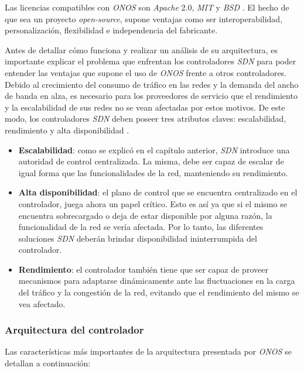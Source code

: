 Las licencias compatibles con \textit{ONOS} son \textit{Apache} 2.0, \textit{MIT} y \textit{BSD} \parencite{onfflic}. El hecho de que sea un proyecto \textit{open-source}, supone ventajas como ser interoperabilidad, personalización, flexibilidad e independencia del fabricante. 

Antes de detallar cómo funciona y realizar un análisis de su arquitectura, es importante explicar el problema que enfrentan los controladores \textit{SDN} para poder entender las ventajas que supone el uso de \textit{ONOS} frente a otros controladores. 
\\

Debido al crecimiento del consumo de tráfico en las redes y la demanda del ancho de banda en alza, es necesario para los proveedores de servicio que el rendimiento y la escalabilidad de sus redes no se vean afectadas por estos motivos. De este modo, los controladores \textit{SDN} deben poseer tres atributos claves: escalabilidad, rendimiento y alta disponibilidad \parencite{sdnproblema}.

\begin{itemize}
	\item \textbf{Escalabilidad}: como se explicó en el capítulo anterior, \textit{SDN} introduce una autoridad de control centralizada. La misma, debe ser capaz de escalar de igual forma que las funcionalidades de la red, manteniendo su rendimiento.
	\item \textbf{Alta disponibilidad}: el plano de control que se encuentra centralizado en el controlador, juega ahora un papel crítico. Esto es así ya que si el mismo se encuentra sobrecargado o deja de estar disponible por alguna razón, la funcionalidad de la red se vería afectada. Por lo tanto, las diferentes soluciones \textit{SDN} deberán brindar disponibilidad ininterrumpida del controlador.
	\item \textbf{Rendimiento}: el controlador también tiene que ser capaz de proveer mecanismos para adaptarse dinámicamente ante las fluctuaciones en la carga del tráfico y la congestión de la red, evitando que el rendimiento del mismo se vea afectado. 
\end{itemize}

\subsubsection{Arquitectura del controlador}
Las características más importantes de la arquitectura presentada por \textit{ONOS} \parencite{onffwhite} se detallan a continuación:

